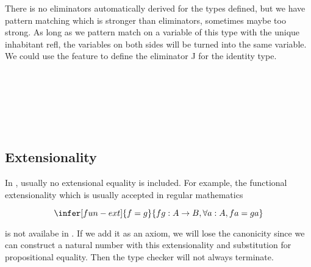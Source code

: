 There is no eliminators automatically derived for the types defined, but we have pattern matching which is stronger than eliminators, sometimes maybe too strong. 
As long as we pattern match on a variable of this type with the unique inhabitant refl, the variables on both sides will be turned into the same variable. 
We could use the feature to define the eliminator J for the identity type.

\begin{code}
%
\\
\> \AgdaSymbol{:} \AgdaSymbol{(} \AgdaSymbol{:} \AgdaSymbol{)(} \AgdaSymbol{:} \AgdaSymbol{)}  \AgdaSymbol{(} \AgdaSymbol{:} \AgdaSymbol{(} \AgdaSymbol{:} \AgdaSymbol{)}      \AgdaSymbol{)}\<%
\\
\>[0]\<[2]%
\>[2]   \<%
\\
\>[0]\<[2]%
\>[2] \AgdaSymbol{(} \AgdaSymbol{:} \AgdaSymbol{)(} \AgdaSymbol{:}   \AgdaSymbol{)}    \<%
\\
\>       \AgdaSymbol{=} \<%
\\
%
\end{code}

\subsection{Extensionality}

In \itt, usually no extensional equality is included. For example, the functional extensionality which is usually accepted in regular mathematics

\begin{equation*}
\infer[fun-ext]{f = g}{f g : A \rightarrow B, \forall a : A, f a = g a}
\end{equation*}

is not availabe in \itt. If we add it as an axiom, we will lose the canonicity since we can construct a natural number with this extensionality and substitution for propositional equality. Then the type checker will not always terminate.

